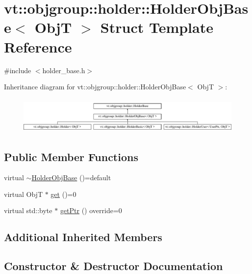 \hypertarget{structvt_1_1objgroup_1_1holder_1_1_holder_obj_base}{}\section{vt\+:\+:objgroup\+:\+:holder\+:\+:Holder\+Obj\+Base$<$ ObjT $>$ Struct Template Reference}
\label{structvt_1_1objgroup_1_1holder_1_1_holder_obj_base}


{\ttfamily \#include $<$holder\+\_\+base.\+h$>$}

Inheritance diagram for vt\+:\+:objgroup\+:\+:holder\+:\+:Holder\+Obj\+Base$<$ ObjT $>$\+:\begin{figure}[H]
\begin{center}
\leavevmode
\includegraphics[height=1.866667cm]{structvt_1_1objgroup_1_1holder_1_1_holder_obj_base}
\end{center}
\end{figure}
\subsection*{Public Member Functions}
\begin{DoxyCompactItemize}
\item 
virtual \hyperlink{structvt_1_1objgroup_1_1holder_1_1_holder_obj_base_a368d2b1e12c87f11475ecf13dcb66129}{$\sim$\+Holder\+Obj\+Base} ()=default
\item 
virtual ObjT $\ast$ \hyperlink{structvt_1_1objgroup_1_1holder_1_1_holder_obj_base_a4b350b0126259d31a62fd426a08f6698}{get} ()=0
\item 
virtual std\+::byte $\ast$ \hyperlink{structvt_1_1objgroup_1_1holder_1_1_holder_obj_base_abd46e1aa84c0fea2554bf19029581e01}{get\+Ptr} () override=0
\end{DoxyCompactItemize}
\subsection*{Additional Inherited Members}


\subsection{Constructor \& Destructor Documentation}
\mbox{\label{structvt_1_1objgroup_1_1holder_1_1_holder_obj_base_a368d2b1e12c87f11475ecf13dcb66129}} 
